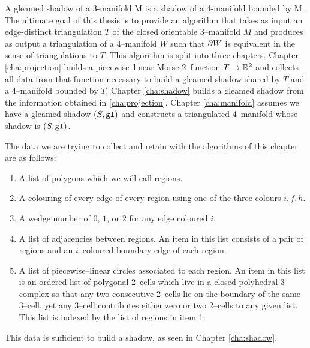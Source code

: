A gleamed shadow of a 3-manifold M is a shadow of a 4-manifold bounded by M.
The ultimate goal of this thesis is to provide an algorithm that takes as input an edge-distinct triangulation $T$ of the closed orientable 3--manifold $M$ and produces as output a triangulation of a 4--manifold $W$ such that $\partial W$ is equivalent in the sense of triangulations to $T$.
This algorithm is split into three chapters.
Chapter \ref{cha:projection} builds a piecewise--linear Morse 2--function $T\to\mathbb{R}^2$ and collects all data from that function necessary to build a gleamed shadow shared by $T$ and a 4--manifold bounded by $T$.
Chapter \ref{cha:shadow} builds a gleamed shadow from the information obtained in \ref{cha:projection}.
Chapter \ref{cha:manifold} assumes we have a gleamed shadow $(S,\texttt{gl})$ and constructs a triangulated 4--manifold whose shadow is $(S,\texttt{gl})$.

The data we are trying to collect and retain with the algorithms of this chapter are as follows:
\begin{enumerate}
  \item A list of polygons which we will call regions.
  \item A colouring of every edge of every region using one of the three colours $i,f,h$.
  \item A wedge number of $0$, $1$, or $2$ for any edge coloured $i$.
  \item A list of adjacencies between regions.
        An item in this list consists of a pair of regions and an $i$--coloured boundary edge of each region.
  \item A list of piecewise--linear circles associated to each region.
        An item in this list is an ordered list of polygonal 2--cells which live in a closed polyhedral 3--complex so that any two consecutive 2--cells lie on the boundary of the same 3--cell, yet any 3--cell contributes either zero or two 2--cells to any given list.  This list is indexed by the list of regions in item 1.
\end{enumerate}
This data is sufficient to build a shadow, as seen in Chapter \ref{cha:shadow}.
